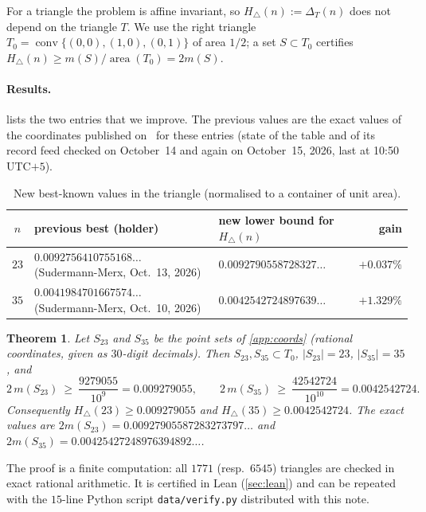 \documentclass[11pt]{article}
\newtheorem{theorem}{Theorem}[section]
\theoremstyle{definition}
\theoremstyle{remark}
\newcommand{\Hn}{H_{\triangle}}
\begin{document}
For a triangle the problem is affine invariant, so $\Hn(n):=\Delta_T(n)$ does not depend on the
triangle $T$. We use the right triangle $T_0=\operatorname{conv}\{(0,0),(1,0),(0,1)\}$ of area
$1/2$; a set $S\subset T_0$ certifies $\Hn(n)\ge m(S)/\operatorname{area}(T_0)=2m(S)$.

\paragraph{Results.}  lists the two entries that we improve. The previous values
are the exact values of the coordinates published on~\cite{site} for these entries (state of the
table and of its record feed checked on October~14 and again on October~15, 2026, last at 10:50 UTC$+5$).

\begin{table}[h]
\centering
\begin{tabular}{@{}cllr@{}}
\toprule
$n$ & previous best (holder) & new lower bound for $\Hn(n)$ & gain\\
\midrule
$23$ & $0.0092756410755168\ldots$ (Sudermann-Merx, Oct.~13, 2026) & $0.0092790558728327\ldots$ & $+0.037\%$\\
$35$ & $0.0041984701667574\ldots$ (Sudermann-Merx, Oct.~10, 2026) & $0.0042542724897639\ldots$ & $+1.329\%$\\
\bottomrule
\end{tabular}
\caption{New best-known values in the triangle (normalised to a container of unit area).}
\label{tab:results}
\end{table}

\begin{theorem}\label{thm:main}
Let $S_{23}$ and $S_{35}$ be the point sets of \cref{app:coords} (rational coordinates, given as
$30$-digit decimals). Then $S_{23},S_{35}\subset T_0$, $|S_{23}|=23$, $|S_{35}|=35$, and
\[
2\,m(S_{23})\ \ge\ \frac{9279055}{10^{9}}=0.009279055,\qquad
2\,m(S_{35})\ \ge\ \frac{42542724}{10^{10}}=0.0042542724 .
\]
Consequently $\Hn(23)\ge0.009279055$ and $\Hn(35)\ge0.0042542724$. The exact values are
$2m(S_{23})=0.00927905587283273797\ldots$ and $2m(S_{35})=0.00425427248976394892\ldots$.
\end{theorem}

The proof is a finite computation: all $1771$ (resp.\ $6545$) triangles are checked in exact
rational arithmetic. It is certified in Lean (\cref{sec:lean}) and can be repeated with the
$15$-line Python script \texttt{data/verify.py} distributed with this note.
\end{document}
